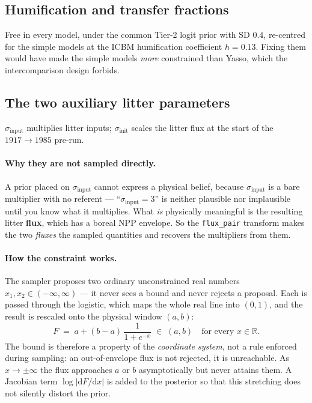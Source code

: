 \documentclass[11pt]{article}
\newcommand{\sinit}{\sigma_{\mathrm{init}}}
\newcommand{\sinput}{\sigma_{\mathrm{input}}}
\begin{document}
\subsection{Humification and transfer fractions}
Free in every model, under the common Tier-2 logit prior with SD $0.4$, re-centred for the
simple models at the ICBM humification coefficient $h = 0.13$. Fixing them would have made the
simple models \emph{more} constrained than Yasso, which the intercomparison design forbids.

\subsection{The two auxiliary litter parameters}
$\sinput$ multiplies litter inputs; $\sinit$ scales the litter flux at the start of the
$1917\rightarrow1985$ pre-run.

\paragraph{Why they are not sampled directly.} A prior placed on $\sinput$ cannot express a
physical belief, because $\sinput$ is a bare multiplier with no referent --- ``$\sinput = 3$'' is
neither plausible nor implausible until you know what it multiplies. What \emph{is} physically
meaningful is the resulting litter \textbf{flux}, which has a boreal NPP envelope. So the
\texttt{flux\_pair} transform makes the two \emph{fluxes} the sampled quantities and recovers the
multipliers from them.

\paragraph{How the constraint works.} The sampler proposes two ordinary unconstrained real
numbers $x_1, x_2 \in (-\infty,\infty)$ --- it never sees a bound and never rejects a proposal.
Each is passed through the logistic, which maps the whole real line into $(0,1)$, and the result
is rescaled onto the physical window $(a,b)$:
\begin{equation}
F \;=\; a + (b-a)\,\frac{1}{1+e^{-x}} \;\in\; (a,b) \quad\text{for every } x\in\mathbb{R}.
\label{eq:squash}
\end{equation}
The bound is therefore a property of the \emph{coordinate system}, not a rule enforced during
sampling: an out-of-envelope flux is not rejected, it is unreachable. As $x\to\pm\infty$ the flux
approaches $a$ or $b$ asymptotically but never attains them. A Jacobian term
$\log|\mathrm{d}F/\mathrm{d}x|$ is added to the posterior so that this stretching does not
silently distort the prior.
\end{document}

